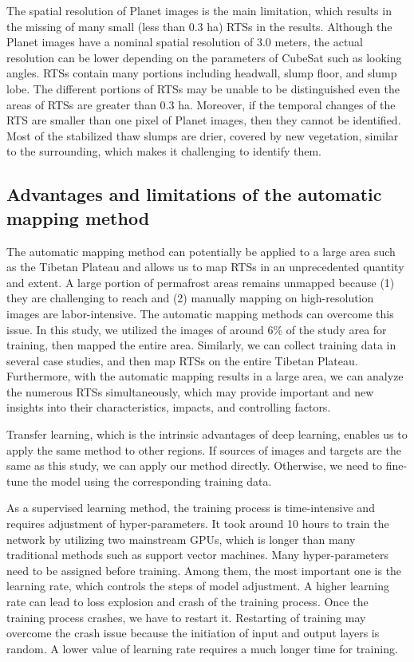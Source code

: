 \documentclass[preprint,12pt,authoryear]{elsarticle}
\begin{document}
The spatial resolution of Planet images is the main limitation, which results in the missing of many small (less than 0.3 ha) RTSs in the results. Although the Planet images have a nominal spatial resolution of 3.0 meters, the actual resolution can be lower depending on the parameters of CubeSat such as looking angles.
RTSs contain many portions including headwall, slump floor, and slump lobe. The different portions of RTSs may be unable to be distinguished even the areas of RTSs are greater than 0.3 ha. Moreover, if the temporal changes of the RTS are smaller than one pixel of Planet images, then they cannot be identified. Most of the stabilized thaw slumps are drier, covered by new vegetation, similar to the surrounding, which makes it challenging to identify them.

\subsection{Advantages and limitations of the automatic mapping method}
\label{subsec_advantage_limitation_method}

The automatic mapping method can potentially be applied to a large area such as the Tibetan Plateau and allows us to map RTSs in an unprecedented quantity and extent. A large portion of permafrost areas remains unmapped because (1) they are challenging to reach and (2) manually mapping on high-resolution images are labor-intensive. The automatic mapping methods can overcome this issue. In this study, we utilized the images of around 6\% of the study area for training, then mapped the entire area. Similarly, we can collect training data in several case studies, and then map RTSs on the entire Tibetan Plateau. Furthermore, with the automatic mapping results in a large area, we can analyze the numerous RTSs simultaneously, which may provide important and new insights into their characteristics, impacts, and controlling factors.  

Transfer learning, which is the intrinsic advantages of deep learning, enables us to apply the same method to other regions. If sources of images and targets are the same as this study, we can apply our method directly. Otherwise, we need to fine-tune the model using the corresponding training data. 

As a supervised learning method, the training process is time-intensive and requires adjustment of hyper-parameters. It took around 10 hours to train the network by utilizing two mainstream GPUs, which is longer than many traditional methods such as support vector machines. Many hyper-parameters need to be assigned before training. Among them, the most important one is the learning rate, which controls the steps of model adjustment. A higher learning rate can lead to loss explosion and crash of the training process. Once the training process crashes, we have to restart it. Restarting of training may overcome the crash issue because the initiation of input and output layers is random. A lower value of learning rate requires a much longer time for training. 
\end{document}
